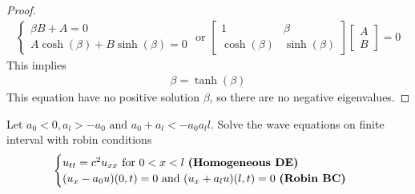 \documentclass{report}
\begin{document}
\begin{proof}
\begin{align*}
\begin{cases}
  \beta  B +A =0 \\
  A \cosh (\beta )+B \sinh (\beta )=0
\end{cases} \text{ or }\begin{bmatrix}
1& \beta  \\
\cosh (\beta ) & \sinh (\beta )
\end{bmatrix}\begin{bmatrix}
A\\
B
\end{bmatrix}=0
\end{align*}
This implies 
\begin{align*}
\beta = \tanh (\beta )
\end{align*}
This equation have no positive solution $\beta $, so there are no negative eigenvalues. 
\end{proof}
\begin{question}{}{}
Let $a_0<0,a_l>-a_0\text{ and }a_0+a_l<-a_0a_ll$. Solve the wave equations on finite interval with robin conditions 
\begin{align*}
\begin{cases}
  u_{tt}=c^2u_{xx}\text{ for }0<x<l\text{ \textbf{(Homogeneous DE)} }\\
  (u_x-a_0u)(0,t)=0\text{ and }(u_x+a_lu)(l,t)=0\text{ \textbf{(Robin BC)} }
\end{cases}
\end{align*}
\end{question}
\end{document}

